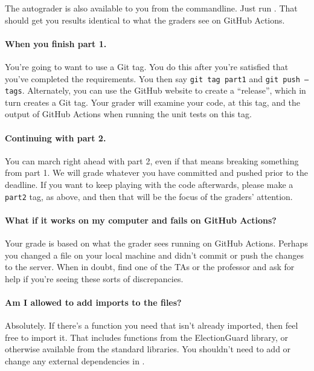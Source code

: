 The autograder is also available to you from the commandline.
Just run .
That should get you results identical to what the graders see
on GitHub Actions.

\paragraph{When you finish part 1.} You're going to want to use a Git
tag. You do this after you're satisfied that you've completed the
requirements. You then say {\tt git tag part1} and {\tt git push
  --tags}. Alternately, you can use the GitHub website to create a
``release'', which in turn creates a Git tag. Your grader will
examine your code, at this tag, and the output of GitHub Actions
when running the unit tests on this tag.

\paragraph{Continuing with part 2.} You can march right ahead with
part 2, even if that means breaking something from part 1. We
will grade whatever you have committed and pushed prior to the
deadline. If you want to keep playing with the code afterwards,
please make a {\tt part2} tag, as above, and then that will
be the focus of the graders' attention.

\paragraph{What if it works on my computer and fails on GitHub
  Actions?} Your grade is based on what the grader sees running on
GitHub Actions. Perhaps you changed a file on your local machine and
didn't commit or push the changes to the server. When in doubt,
find one of the TAs or the professor and ask for help if you're
seeing these sorts of discrepancies.

\paragraph{Am I allowed to add imports to the files?} Absolutely. If
there's a function you need that isn't already imported, then feel
free to import it. That includes functions from the ElectionGuard
library, or otherwise available from the standard
 libraries.
You shouldn't need to add or change any external dependencies in
.

